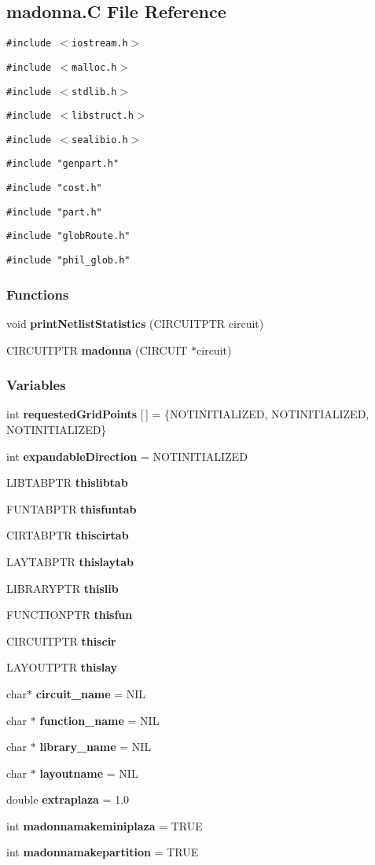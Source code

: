 \subsection{madonna.C File Reference}
\label{madonna.C}
{\tt \#include $<$iostream.h$>$}\par
{\tt \#include $<$malloc.h$>$}\par
{\tt \#include $<$stdlib.h$>$}\par
{\tt \#include $<$libstruct.h$>$}\par
{\tt \#include $<$sealibio.h$>$}\par
{\tt \#include "genpart.h"}\par
{\tt \#include "cost.h"}\par
{\tt \#include "part.h"}\par
{\tt \#include "glob\-Route.h"}\par
{\tt \#include "phil\_\-glob.h"}\par
\subsubsection*{Functions}
\begin{CompactItemize}
\item 
void {\bf print\-Netlist\-Statistics} (CIRCUITPTR circuit)
\item 
CIRCUITPTR {\bf madonna} (CIRCUIT $\ast$circuit)
\end{CompactItemize}
\subsubsection*{Variables}
\begin{CompactItemize}
\item 
int {\bf requested\-Grid\-Points} [$\,$] = \{NOTINITIALIZED, NOTINITIALIZED, NOTINITIALIZED\}
\item 
int {\bf expandable\-Direction} = NOTINITIALIZED
\item 
LIBTABPTR {\bf thislibtab}
\item 
FUNTABPTR {\bf thisfuntab}
\item 
CIRTABPTR {\bf thiscirtab}
\item 
LAYTABPTR {\bf thislaytab}
\item 
LIBRARYPTR {\bf thislib}
\item 
FUNCTIONPTR {\bf thisfun}
\item 
CIRCUITPTR {\bf thiscir}
\item 
LAYOUTPTR {\bf thislay}
\item 
char$\ast$ {\bf circuit\_\-name} = NIL
\item 
char $\ast$ {\bf function\_\-name} = NIL
\item 
char $\ast$ {\bf library\_\-name} = NIL
\item 
char $\ast$ {\bf layoutname} = NIL
\item 
double {\bf extraplaza} = 1.0
\item 
int {\bf madonnamakeminiplaza} = TRUE
\item 
int {\bf madonnamakepartition} = TRUE
\end{CompactItemize}


